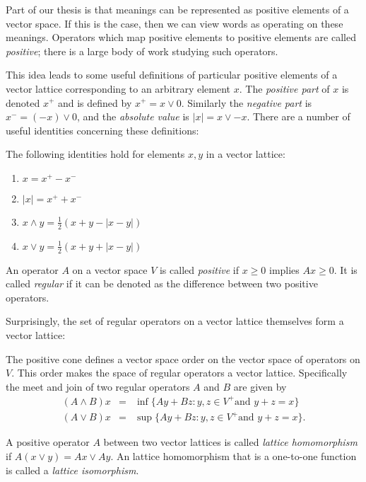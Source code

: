 \documentclass[12pt]{report}
\begin{document}
Part of our thesis is that meanings can be represented as positive elements of a vector space. If this is the case, then we can view words as operating on these meanings. Operators which map positive elements to positive elements are called \emph{positive}; there is a large body of work studying such operators.

This idea leads to some useful definitions of particular positive elements of a vector lattice corresponding to an arbitrary element $x$. The \emph{positive part} of $x$ is denoted $x^+$ and is defined by $x^+ = x \lor 0$. Similarly the \emph{negative part} is $x^- = (-x)\lor 0$, and the \emph{absolute value} is $|x| = x \lor -x$. There are a number of useful identities concerning these definitions:
\begin{prop}
The following identities hold for elements $x,y$ in a vector lattice:
\begin{enumerate}[\indent(a).]
\item $x = x^+ - x^-$
\item $|x| = x^+ + x^-$
\item $x\land y = \frac{1}{2}(x + y - |x - y|)$
\item $x\lor y =  \frac{1}{2}(x + y + |x - y|)$
\end{enumerate}
\end{prop}

\begin{defn}
An operator $A$ on a vector space $V$ is called \emph{positive} if $x \ge 0$ implies $Ax \ge 0$. It is called \emph{regular} if it can be denoted as the difference between two positive operators.
\end{defn}


Surprisingly, the set of regular operators on a vector lattice themselves form a vector lattice:
\begin{prop}
The positive cone defines a vector space order on the vector space of operators on $V$. This order makes the space of regular operators a vector lattice. Specifically the meet and join of two regular operators $A$ and $B$ are given by
\begin{eqnarray*}
(A \land B)x & = & \inf\{Ay + Bz : y,z \in V^+ \text{and } y + z = x\}\\
(A \lor B)x & = & \sup\{Ay + Bz : y,z \in V^+ \text{and } y + z = x\}.
\end{eqnarray*}
\end{prop}

\begin{defn}
A positive operator $A$ between two vector lattices is called \emph{lattice homomorphism} if $A(x \lor y) = Ax \lor Ay$. An lattice homomorphism that is a one-to-one function is called a \emph{lattice isomorphism}.
\end{defn}
\end{document}
